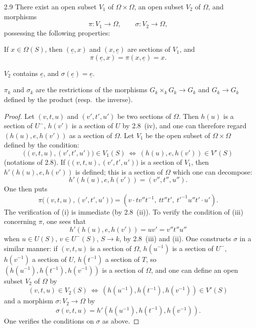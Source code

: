 \begin{proposition}{2.9}\label{XXV.2.9}
There exist an open subset $V_1$ of $\Omega\times\Omega$, an open subset $V_2$ of $\Omega$, and morphisms
\[
\pi:V_1\to\Omega,\qquad\sigma:V_2\to\Omega,
\]
possessing the following properties:
\begin{enumeratei}
\item If $x\in\Omega(S)$, then $(\underline e,x)$ and $(x,\underline e)$ are sections of $V_1$, and
\[
\pi(\underline e,x)=\pi(x,\underline e)=x.
\]
\item $V_2$ contains $\underline e$, and $\sigma(\underline e)=\underline e$.
\item $\pi_k$ and $\sigma_k$ are the restrictions of the morphisms $G_k\times_k G_k\to G_k$ and $G_k\to G_k$ defined by the product (resp.~the inverse).
\end{enumeratei}
\end{proposition}
\begin{proof}
Let $(v,t,u)$ and $(v',t',u')$ be two sections of $\Omega$. Then $h(u)$ is a section of $U^-$, $h(v')$ is a section of $U$ by 2.8~(iv), and one can therefore regard $(h(u),e,h(v'))$ as a section of $\Omega$. Let $V_1$ be the open subset of $\Omega\times\Omega$ defined by the condition:
\[
\bigl((v,t,u),(v',t',u')\bigr)\in V_1(S)\ \Longleftrightarrow\ (h(u),e,h(v'))\in V'(S)
\]
(notations of 2.8). If $\bigl((v,t,u),(v',t',u')\bigr)$ is a section of $V_1$, then $h'(h(u),e,h(v'))$ is defined; this is a section of $\Omega$ which one can decompose:
\[
h'(h(u),e,h(v'))=(v'',t'',u'').
\]
One then puts
\[
\pi\bigl((v,t,u),(v',t',u')\bigr)=(v\cdot tv''t^{-1},\ tt''t',\ t'^{-1}u''t'\cdot u').
\]
The verification of (i) is immediate (by 2.8~(ii)). To verify the condition of (iii) concerning $\pi$, one sees that
\[
h'(h(u),e,h(v'))=uv'=v''t''u''
\]
when $u\in U(S)$, $v\in U^-(S)$, $S\to k$, by 2.8~(iii) and (ii).
One constructs $\sigma$ in a similar manner: if $(v,t,u)$ is a section of $\Omega$, $h(u^{-1})$ is a section of $U^-$, $h(v^{-1})$ a section of $U$, $h(t^{-1})$ a section of $T$, so $(h(u^{-1}),h(t^{-1}),h(v^{-1}))$ is a section of $\Omega$, and one can define an open subset $V_2$ of $\Omega$ by
\[
(v,t,u)\in V_2(S)\ \Longleftrightarrow\ (h(u^{-1}),h(t^{-1}),h(v^{-1}))\in V'(S)
\]
and a morphism $\sigma:V_2\to\Omega$ by
\[
\sigma(v,t,u)=h'(h(u^{-1}),h(t^{-1}),h(v^{-1})).
\]
One verifies the conditions on $\sigma$ as above.
\end{proof}
